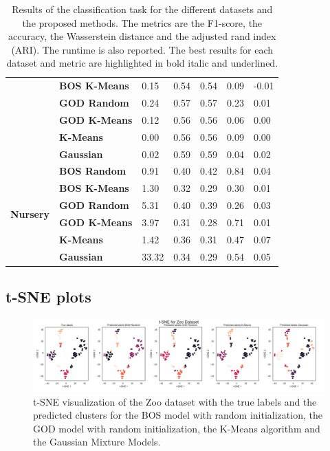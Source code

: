 \begin{table}
\begin{adjustbox}{width=\columnwidth}
\begin{tabular}{lllllll}
\textbf{} & \textbf{BOS K-Means} & 0.15 & 0.54 & 0.54 & 0.09 & -0.01 \\
\textbf{} & \textbf{GOD Random} & 0.24 & 0.57 & 0.57 & 0.23 & 0.01 \\
\textbf{} & \textbf{GOD K-Means} & 0.12 & 0.56 & 0.56 & 0.06 & 0.00 \\
\textbf{} & \textbf{K-Means} & 0.00 & 0.56 & 0.56 & 0.09 & 0.00 \\
\textbf{} & \textbf{Gaussian} & 0.02 & 0.59 & 0.59 & 0.04 & 0.02 \\
\cline{1-7}
\multirow[t]{6}{*}{\textbf{Nursery}} & \textbf{BOS Random} & 0.91 & 0.40 & 0.42 & 0.84 & 0.04 \\
\textbf{} & \textbf{BOS K-Means} & 1.30 & 0.32 & 0.29 & 0.30 & 0.01 \\
\textbf{} & \textbf{GOD Random} & 5.31 & 0.40 & 0.39 & 0.26 & 0.03 \\
\textbf{} & \textbf{GOD K-Means} & 3.97 & 0.31 & 0.28 & 0.71 & 0.01 \\
\textbf{} & \textbf{K-Means} & 1.42 & 0.36 & 0.31 & 0.47 & 0.07 \\
\textbf{} & \textbf{Gaussian} & 33.32 & 0.34 & 0.29 & 0.54 & 0.05 \\
\cline{1-7}
\bottomrule
\end{tabular}
\end{adjustbox}
\caption{
Results of the classification task for the different datasets and the proposed methods. The metrics are the F1-score, the accuracy, the Wasserstein distance and the adjusted rand index (ARI). 
The runtime is also reported. The best results for each dataset and metric are highlighted in bold italic and underlined. 
}
\label{tab:results_real}
\end{table}


\subsection*{t-SNE plots}
\label{sec:appendix_tsne}

\begin{figure}[H]
    \centering
    \includegraphics[width=\textwidth]{python_figures/tsne_zoo.png}
    \caption{t-SNE visualization of the Zoo dataset with the true labels and the predicted clusters for the BOS model with random initialization, the GOD model with random initialization, the K-Means algorithm and the Gaussian Mixture Models.}
    \label{fig:tsne_zoo}
\end{figure}

